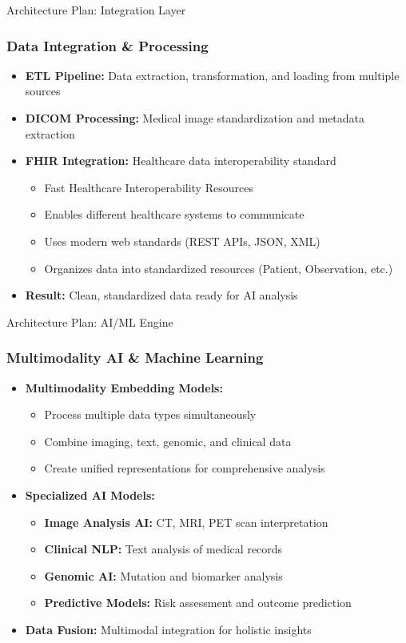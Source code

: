 \documentclass{beamer}
\begin{document}
\begin{frame}{Architecture Plan: Integration Layer}
    \frametitle{Data Integration \& Processing}
    \begin{itemize}
        \item \textbf{ETL Pipeline:} Data extraction, transformation, and loading from multiple sources
        \item \textbf{DICOM Processing:} Medical image standardization and metadata extraction
        \item \textbf{FHIR Integration:} Healthcare data interoperability standard
        \begin{itemize}
            \item Fast Healthcare Interoperability Resources
            \item Enables different healthcare systems to communicate
            \item Uses modern web standards (REST APIs, JSON, XML)
            \item Organizes data into standardized resources (Patient, Observation, etc.)
        \end{itemize}
        \item \textbf{Result:} Clean, standardized data ready for AI analysis
    \end{itemize}
\end{frame}

\begin{frame}{Architecture Plan: AI/ML Engine}
    \frametitle{Multimodality AI \& Machine Learning}
    \begin{itemize}
        \item \textbf{Multimodality Embedding Models:}
        \begin{itemize}
            \item Process multiple data types simultaneously
            \item Combine imaging, text, genomic, and clinical data
            \item Create unified representations for comprehensive analysis
        \end{itemize}
        \item \textbf{Specialized AI Models:}
        \begin{itemize}
            \item \textbf{Image Analysis AI:} CT, MRI, PET scan interpretation
            \item \textbf{Clinical NLP:} Text analysis of medical records
            \item \textbf{Genomic AI:} Mutation and biomarker analysis
            \item \textbf{Predictive Models:} Risk assessment and outcome prediction
        \end{itemize}
        \item \textbf{Data Fusion:} Multimodal integration for holistic insights
    \end{itemize}
\end{frame}
\end{document}
